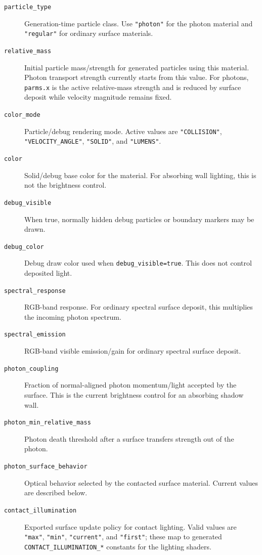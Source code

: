 \begin{description}
    \item[\texttt{particle\_type}] Generation-time particle class.  Use
    \texttt{"photon"} for the photon material and \texttt{"regular"} for
    ordinary surface materials.
    \item[\texttt{relative\_mass}] Initial particle mass/strength for generated
    particles using this material.  Photon transport strength currently starts
    from this value.  For photons, \texttt{parms.x} is the active
    relative-mass strength and is reduced by surface deposit while velocity
    magnitude remains fixed.
    \item[\texttt{color\_mode}] Particle/debug rendering mode.  Active values
    are \texttt{"COLLISION"}, \texttt{"VELOCITY\_ANGLE"},
    \texttt{"SOLID"}, and \texttt{"LUMENS"}.
    \item[\texttt{color}] Solid/debug base color for the material.  For
    absorbing wall lighting, this is not the brightness control.
    \item[\texttt{debug\_visible}] When true, normally hidden debug particles
    or boundary markers may be drawn.
    \item[\texttt{debug\_color}] Debug draw color used when
    \texttt{debug\_visible=true}.  This does not control deposited light.
    \item[\texttt{spectral\_response}] RGB-band response.  For ordinary
    spectral surface deposit, this multiplies the incoming photon spectrum.
    \item[\texttt{spectral\_emission}] RGB-band visible emission/gain for
    ordinary spectral surface deposit.
    \item[\texttt{photon\_coupling}] Fraction of normal-aligned photon
    momentum/light accepted by the surface.  This is the current brightness
    control for an absorbing shadow wall.
    \item[\texttt{photon\_min\_relative\_mass}] Photon death threshold after a
    surface transfers strength out of the photon.
    \item[\texttt{photon\_surface\_behavior}] Optical behavior selected by
    the contacted surface material.  Current values are described below.
    \item[\texttt{contact\_illumination}] Exported surface update policy for
    contact lighting.  Valid values are \texttt{"max"}, \texttt{"min"},
    \texttt{"current"}, and \texttt{"first"}; these map to generated
    \texttt{CONTACT\_ILLUMINATION\_*} constants for the lighting shaders.
\end{description}

